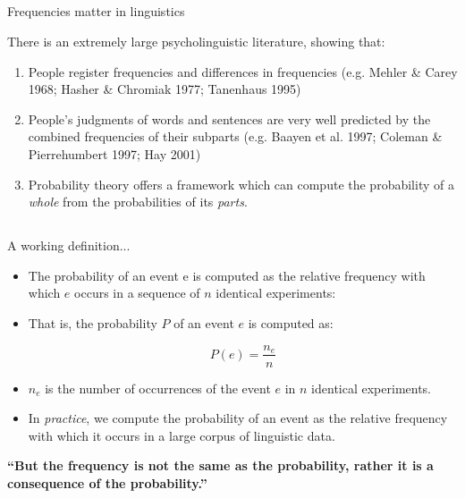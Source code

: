\documentclass[9pt,xcolor=pdftex,dvipsnames,table]{beamer}
\begin{document}
\subsection{}
\begin{frame}{Frequencies matter in linguistics}

{\large There is an extremely large psycholinguistic literature, showing that:}
     \begin{enumerate}
          \item People register frequencies and differences in frequencies {\small (e.g. Mehler \& Carey 1968; Hasher \& Chromiak 1977; Tanenhaus 1995)}
          \item People's judgments of words and sentences are very well predicted
by the combined frequencies of their subparts {\small (e.g. Baayen et al. 1997; Coleman \& Pierrehumbert 1997; Hay 2001)}
		  \item Probability theory offers a framework which can compute the probability
of a \emph{whole} from the probabilities of its \emph{parts}.
     \end{enumerate}
\end{frame}

\subsection{}
\begin{frame}{A working definition...}

\vspace{.5cm}
     \begin{itemize}
          \item The probability of an event e is computed as the relative frequency with which $e$ occurs in a sequence of $n$ identical experiments:
          \item That is, the probability $P$ of an event $e$ is computed as:
          
          	\begin{equation}{P(e) = \frac{n_e}{n}}\end{equation}
          
          \item $n_e$ is the number of occurrences of the event $e$ in $n$ identical experiments.
          \item In \emph{practice}, we compute the probability of an event as the relative frequency with which it occurs in a large corpus of linguistic data.
     \end{itemize}
     
     {\large \textbf{``But the frequency is not the same as the probability, rather it is a consequence of the probability.''}}
\end{frame}
\end{document}
